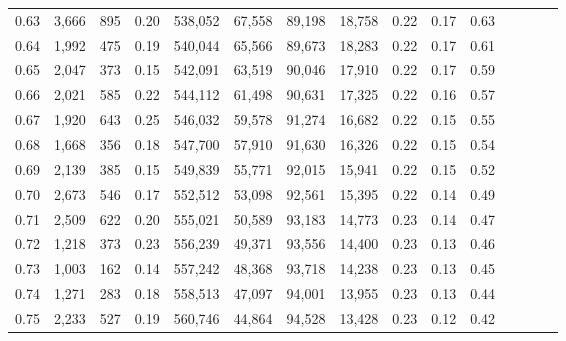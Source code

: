 \begin{tabular}{rrrcrrrrrrrrrrr}
0.63 &   3,666 &    895 &                                       0.20 &  538,052 &   67,558 &   89,198 &   18,758 &  0.22 &  0.17 &                         0.63 \\
0.64 &   1,992 &    475 &                                       0.19 &  540,044 &   65,566 &   89,673 &   18,283 &  0.22 &  0.17 &                         0.61 \\
0.65 &   2,047 &    373 &                                       0.15 &  542,091 &   63,519 &   90,046 &   17,910 &  0.22 &  0.17 &                         0.59 \\
0.66 &   2,021 &    585 &                                       0.22 &  544,112 &   61,498 &   90,631 &   17,325 &  0.22 &  0.16 &                         0.57 \\
0.67 &   1,920 &    643 &                                       0.25 &  546,032 &   59,578 &   91,274 &   16,682 &  0.22 &  0.15 &                         0.55 \\
0.68 &   1,668 &    356 &                                       0.18 &  547,700 &   57,910 &   91,630 &   16,326 &  0.22 &  0.15 &                         0.54 \\
0.69 &   2,139 &    385 &                                       0.15 &  549,839 &   55,771 &   92,015 &   15,941 &  0.22 &  0.15 &                         0.52 \\
0.70 &   2,673 &    546 &                                       0.17 &  552,512 &   53,098 &   92,561 &   15,395 &  0.22 &  0.14 &                         0.49 \\
0.71 &   2,509 &    622 &                                       0.20 &  555,021 &   50,589 &   93,183 &   14,773 &  0.23 &  0.14 &                         0.47 \\
0.72 &   1,218 &    373 &                                       0.23 &  556,239 &   49,371 &   93,556 &   14,400 &  0.23 &  0.13 &                         0.46 \\
0.73 &   1,003 &    162 &                                       0.14 &  557,242 &   48,368 &   93,718 &   14,238 &  0.23 &  0.13 &                         0.45 \\
0.74 &   1,271 &    283 &                                       0.18 &  558,513 &   47,097 &   94,001 &   13,955 &  0.23 &  0.13 &                         0.44 \\
0.75 &   2,233 &    527 &                                       0.19 &  560,746 &   44,864 &   94,528 &   13,428 &  0.23 &  0.12 &                         0.42 \\

\end{tabular}
